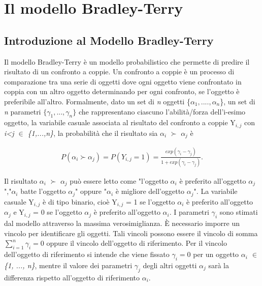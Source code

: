 \chapter{Il modello Bradley-Terry}
\label{cap:BT}



\section{Introduzione al Modello Bradley-Terry}
Il modello Bradley-Terry \autocite{bradley1952rank} è un modello probabilistico che permette di predire il risultato di un confronto a coppie. Un confronto a coppie è un processo di comparazione tra una serie di oggetti dove ogni oggetto viene confrontato in coppia con un altro oggetto determinando per ogni confronto, se l'oggetto è preferibile all'altro.
Formalmente, dato un set di \emph{n} oggetti \{$\alpha_{1},....,\alpha_{n}$\}, un set di \emph{n} parametri $ \{\gamma_{1}, ..., \gamma_{n}\}$ che rappresentano ciascuno l'abilità/forza dell'i-esimo oggetto, la variabile casuale associata al risultato del confronto a coppie Y$_{i,j}$ con \emph{i<j $\in$ \{1,...,n\}}, la probabilità che il risultato sia $\alpha_{i}$ $\succ$ $\alpha_{j}$ è

\begin{align} 
	P(\alpha_{i} \succ \alpha_{j}) = P(Y_{i,j} = 1) = \frac{exp(\gamma_{i} - \gamma_{j})}{1 + exp(\gamma_{i} - \gamma_{j})} \label{for:3.1}.
\end{align}

Il risultato $\alpha_{i}$ $\succ$ $\alpha_{j}$ può essere letto come "l'oggetto $\alpha_{i}$ è preferito all'oggetto $\alpha_{j}$","$\alpha_{i}$ batte l'oggetto $\alpha_{j}$" oppure "$\alpha_{i}$ è migliore dell'oggetto $\alpha_{j}$". La variabile casuale Y$_{i,j}$ è di tipo binario, cioè Y$_{i,j}$ = 1 se l'oggetto $\alpha_{i}$ è preferito all'oggetto $\alpha_{j}$ e Y$_{i,j}$ = 0 se l'oggetto $\alpha_{j}$ è preferito all'oggetto $\alpha_{i}$. I parametri $\gamma_{i}$ sono stimati dal modello attraverso la massima verosimiglianza.
È necessario imporre un vincolo per identificare gli oggetti. Tali vincoli possono essere il vincolo di somma $ \sum_{i=1}^{n} \gamma_{i} = 0 $ oppure il vincolo dell'oggetto di riferimento.
Per il vincolo dell'oggetto di riferimento si intende che viene fissato $\gamma_{i} = 0$ per un oggetto \emph{$\alpha_{i}$ $\in$ \{1, ..., n\}}, mentre il valore dei parametri $\gamma_{j}$ degli altri oggetti $\alpha_{j}$ sarà la differenza rispetto all'oggetto di riferimento $\alpha_{i}$.\\

